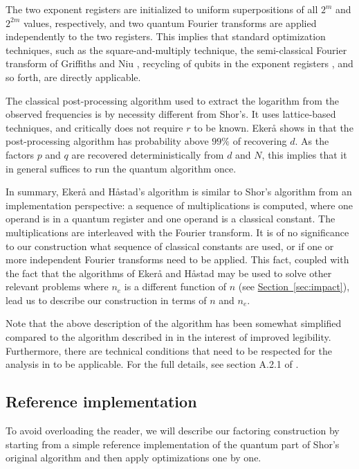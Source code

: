 \documentclass[superscriptaddress,notitlepage,longbibliography]{revtex4-1}
\theoremstyle{definition}
\theoremstyle{definition}
\renewcommand{\sec}[1]{\hyperref[sec:#1]{Section~\ref*{sec:#1}}}
\begin{document}
The two exponent registers are initialized to uniform superpositions of all $2^m$ and $2^{2m}$ values, respectively, and two quantum Fourier transforms are applied independently to the two registers.
This implies that standard optimization techniques, such as the square-and-multiply technique, the semi-classical Fourier transform of Griffiths and Niu \cite{griffiths1996semiclassical}, recycling of qubits in the exponent registers \cite{mosca1999recycle, parker2000recycle}, and so forth, are directly applicable.

The classical post-processing algorithm used to extract the logarithm from the observed frequencies is by necessity different from Shor's.
It uses lattice-based techniques, and critically does not require $r$ to be known.
Ekerå shows in \cite{ekeraa2017pp} that the post-processing algorithm has probability above $99\%$ of recovering $d$.
As the factors $p$ and $q$ are recovered deterministically from $d$ and $N$, this implies that it in general suffices to run the quantum algorithm once.

In summary, Ekerå and Håstad's algorithm is similar to Shor's algorithm from an implementation perspective:
a sequence of multiplications is computed, where one operand is in a quantum register and one operand is a classical constant.
The multiplications are interleaved with the Fourier transform.
It is of no significance to our construction what sequence of classical constants are used, or if one or more independent Fourier transforms need to be applied.
This fact, coupled with the fact that the algorithms of Ekerå and Håstad may be used to solve other relevant problems where $n_e$ is a different function of $n$ (see \sec{impact}), lead us to describe our construction in terms of $n$ and $n_e$.

Note that the above description of the algorithm has been somewhat simplified compared to the algorithm described in \cite{ekeraa2017quantum, ekeraa2017pp} in the interest of improved legibility.
Furthermore, there are technical conditions that need to be respected for the analysis in \cite{ekeraa2017pp} to be applicable.
For the full details, see section A.2.1 of \cite{ekeraa2017pp}.

\subsection{Reference implementation}

To avoid overloading the reader, we will describe our factoring construction by starting from a simple reference implementation of the quantum part of Shor's original algorithm and then apply optimizations one by one.
\end{document}

